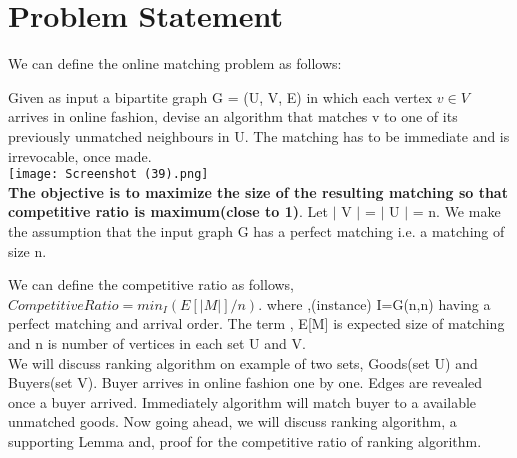 \documentclass[conference,compsoc]{IEEEtran}
\begin{document}
\section{Problem Statement}
\noindent We can define the online matching problem as follows:\par
Given as input a bipartite graph G = (U, V, E) in which each vertex $ v \in V $ arrives in online fashion, devise an algorithm that matches v to one of its previously unmatched neighbours in U. The matching has to be immediate and is irrevocable, once made. \\
\texttt{[image: Screenshot (39).png]}
\\
\textbf{The objective is to maximize the size of the resulting matching so that competitive ratio is maximum(close to 1)}.
Let $|$ V $|$ = $|$ U $|$ = n. We make the assumption that the input graph G has a perfect matching i.e. a matching of size n.
\par
We can define the competitive ratio as follows,
$ Competitive Ratio= min_I ( E[|M|]/n ) $. where ,(instance) I=G(n,n) having a perfect matching and arrival order. The term , E[M] is expected size of matching and n is number of vertices in each set U and V. \\
We will discuss ranking algorithm on example of two sets, Goods(set U) and Buyers(set V). Buyer arrives in online fashion one by one. Edges are revealed once a buyer arrived. Immediately algorithm will match buyer to a available unmatched goods. Now going ahead, we will discuss ranking algorithm, a supporting Lemma and, proof for the competitive ratio of ranking algorithm.
\end{document}
